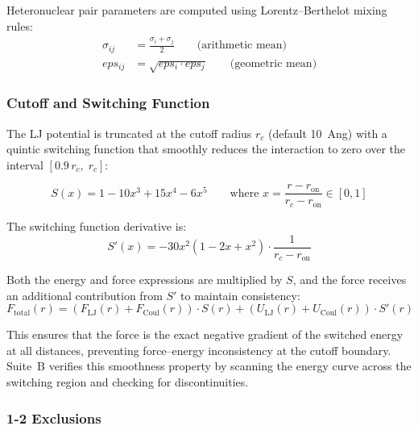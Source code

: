 \documentclass[11pt,twoside]{article}
\def\AA{Ang}%
\def\varepsilon{eps}%
\begin{document}
Heteronuclear pair parameters are computed using Lorentz--Berthelot mixing rules:
\begin{align}
  \sigma_{ij} &= \frac{\sigma_i + \sigma_j}{2} \qquad \text{(arithmetic mean)} \label{eq:LB-sigma} \\
  \varepsilon_{ij} &= \sqrt{\varepsilon_i \cdot \varepsilon_j} \qquad \text{(geometric mean)} \label{eq:LB-eps}
\end{align}

\subsubsection{Cutoff and Switching Function}

The LJ potential is truncated at the cutoff radius $r_c$ (default 10~\AA) with a quintic switching function that smoothly reduces the interaction to zero over the interval $[0.9\,r_c,\; r_c]$:

\begin{equation}
  S(x) = 1 - 10x^3 + 15x^4 - 6x^5 \qquad \text{where } x = \frac{r - r_{\mathrm{on}}}{r_c - r_{\mathrm{on}}} \in [0, 1]
  \label{eq:switch}
\end{equation}

The switching function derivative is:
\begin{equation}
  S'(x) = -30x^2(1 - 2x + x^2) \cdot \frac{1}{r_c - r_{\mathrm{on}}}
  \label{eq:switch-deriv}
\end{equation}

Both the energy and force expressions are multiplied by $S$, and the force receives an additional contribution from $S'$ to maintain consistency:
\begin{equation}
  F_{\mathrm{total}}(r) = \left(F_{\mathrm{LJ}}(r) + F_{\mathrm{Coul}}(r)\right) \cdot S(r) + \left(U_{\mathrm{LJ}}(r) + U_{\mathrm{Coul}}(r)\right) \cdot S'(r)
  \label{eq:switched-force}
\end{equation}

This ensures that the force is the exact negative gradient of the switched energy at all distances, preventing force--energy inconsistency at the cutoff boundary. Suite~B verifies this smoothness property by scanning the energy curve across the switching region and checking for discontinuities.

\subsubsection{1-2 Exclusions}
\end{document}
